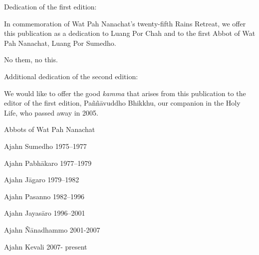 
Dedication of the first edition:

In commemoration of Wat Pah Nanachat's twenty-fifth Rains Retreat, we offer this publication as a dedication to Luang Por Chah and to the first Abbot of Wat Pah Nanachat, Luang Por Sumedho.

No them, no this.

Additional dedication of the second edition:

We would like to offer the good \emph{kamma} that arises from this
publication to the editor of the first edition, Paññāvuddho Bhikkhu, our
companion in the Holy Life, who passed away in 2005.

\newpage

Abbots of Wat Pah Nanachat

Ajahn Sumedho 1975--1977

Ajahn Pabhākaro 1977--1979

Ajahn Jāgaro 1979--1982

Ajahn Pasanno 1982--1996

Ajahn Jayasāro 1996--2001

Ajahn Ñānadhammo 2001-2007

Ajahn Kevali 2007- present

